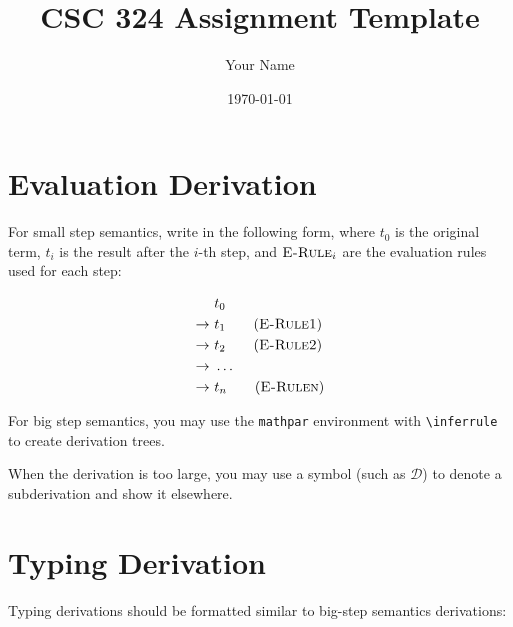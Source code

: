 \documentclass[11pt,letterpaper]{article}
\begin{document}
\title{CSC 324 Assignment Template}
\author{Your Name}
\date{\today}

\maketitle

\section*{Evaluation Derivation}

For small step semantics, write in the following form, where $t_0$ is the original term,
$t_i$ is the result after the $i$-th step,
and $\textsc{E-Rule}_i$ are the evaluation rules used for each step:

\begin{alignat*}{1}
  & \ t_0 \\
  \to & \ t_1 \tag{\textsc{E-Rule1}} \\
  \to & \ t_2 \tag{\textsc{E-Rule2}} \\
  \to & \ \dots \\
  \to & \ t_n \tag{\textsc{E-Rulen}} \\
\end{alignat*}

For big step semantics, you may use the \lstinline{mathpar} environment with
\lstinline{\inferrule} to create derivation trees.

\begin{mathpar}
\end{mathpar}

When the derivation is too large, you may use a symbol (such as $\mathcal{D}$)
to denote a subderivation and show it elsewhere.

\section*{Typing Derivation}

Typing derivations should be formatted similar to big-step semantics derivations:

\begin{mathpar}
\end{mathpar}
\end{document}
